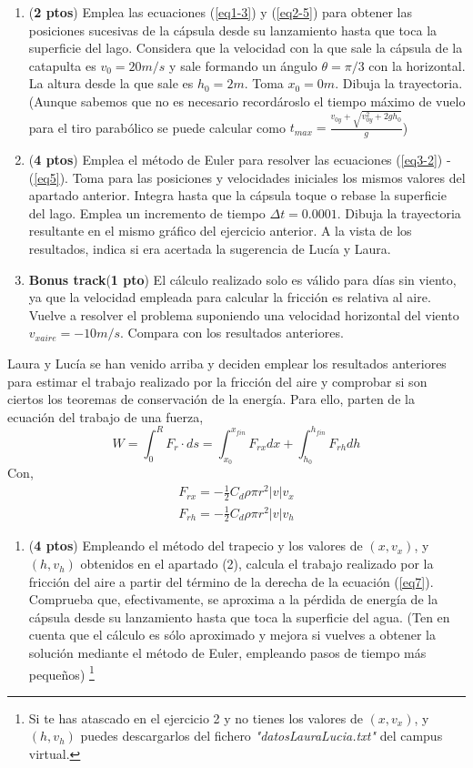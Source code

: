 \begin{enumerate}
	\item (\textbf{2 ptos}) Emplea las ecuaciones (\ref{eq1-3}) y (\ref{eq2-5}) para obtener las posiciones sucesivas de la cápsula desde su lanzamiento hasta que toca la superficie del lago. Considera que la velocidad con la que sale la cápsula de la catapulta es $v_0 = 20 m/s$ y sale formando un ángulo $\theta = \pi/3$ con la horizontal. La altura desde la que sale es $h_0 = 2m$. Toma $x_0=0m$. Dibuja la trayectoria. (Aunque sabemos que no es necesario recordároslo el tiempo máximo de vuelo para el tiro parabólico se puede calcular como $t_{max} = \frac{v_{0y} + \sqrt{v_{0y}^2+2gh_0}}{g}$)
	
	
	\item (\textbf{4 ptos}) Emplea el método de Euler para resolver las ecuaciones (\ref{eq3-2}) - (\ref{eq5}). Toma para las posiciones y velocidades iniciales los mismos valores del apartado anterior. Integra hasta que la cápsula toque o rebase la superficie del lago. Emplea un incremento de tiempo $\Delta t = 0.0001$. Dibuja la trayectoria resultante en el mismo gráfico del ejercicio anterior.
	A la vista de los resultados, indica si era acertada la sugerencia de Lucía y Laura.
	
	\item \textbf{Bonus track}(\textbf{1 pto}) El cálculo realizado solo es válido para días sin viento, ya que la velocidad empleada para calcular la fricción es relativa al aire. Vuelve a resolver el problema suponiendo una velocidad horizontal del viento $v_{xaire} = -10 m/s$. Compara con los resultados anteriores.
\end{enumerate}
Laura y Lucía se han venido arriba y deciden emplear los resultados anteriores para estimar el trabajo realizado por la fricción del aire y comprobar si son ciertos los teoremas de conservación de la energía.
Para ello, parten de la ecuación del trabajo de una fuerza,
\begin{equation}\label{eq7}
	W = \int_0^R F_r\cdot ds = \int_{x_0}^{x_{fin}}F_{rx}dx + \int_{h_0}^{h_{fin}} F_{rh}dh
\end{equation}
Con,
\begin{align}
	F_{rx} = - \frac{1}{2}C_d\rho\pi r^2|v|v_x\\
	F_{rh} = - \frac{1}{2}C_d\rho\pi r^2|v|v_h
\end{align}
\begin{enumerate}[resume]
	\item (\textbf{4 ptos}) Empleando el método del trapecio y los valores de $(x,v_x)$, y $(h,v_h)$ obtenidos en el apartado (2), calcula el trabajo realizado por la fricción del aire a partir del término de la derecha de la ecuación (\ref{eq7}).
	Comprueba que, efectivamente, se aproxima a la pérdida de energía de la cápsula desde su lanzamiento hasta que toca la superficie del agua. (Ten en cuenta que el cálculo es sólo aproximado y mejora si vuelves a obtener la solución mediante el método de Euler, empleando pasos de tiempo más pequeños) \footnote{Si te has atascado en el ejercicio 2 y no tienes los valores de  $(x,v_x)$, y $(h,v_h)$ puedes descargarlos del fichero \textit{"datosLauraLucia.txt"} del campus virtual.}
\end{enumerate}

\fussy
